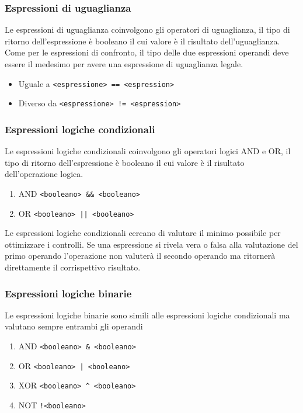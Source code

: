 \subsubsection{Espressioni di uguaglianza}
Le espressioni di uguaglianza coinvolgono gli operatori di uguaglianza, 
il tipo di ritorno dell'espressione è booleano il cui valore è il risultato dell'uguaglianza. 
\\
Come per le espressioni di confronto, il tipo delle due espressioni operandi deve essere il medesimo
per avere una espressione di uguaglianza legale.
\begin{itemize}
    \item Uguale a \lstinline|<espressione> == <espression>|
    \item Diverso da \lstinline|<espressione> != <espression>|
\end{itemize}

\subsubsection{Espressioni logiche condizionali}
Le espressioni logiche condizionali coinvolgono gli operatori logici AND e OR,
il tipo di ritorno dell'espressione è booleano il cui valore è il risultato dell'operazione logica.
\begin{enumerate}
    \item AND \lstinline|<booleano> && <booleano>|
    \item OR \lstinline=<booleano> || <booleano>=
\end{enumerate}

Le espressioni logiche condizionali cercano di valutare il minimo possibile per ottimizzare i controlli.
Se una espressione si rivela vera o falsa alla valutazione del primo operando l'operazione non 
valuterà il secondo operando ma ritornerà direttamente il corrispettivo risultato.

\subsubsection{Espressioni logiche binarie}
Le espressioni logiche binarie sono simili alle espressioni logiche condizionali ma valutano sempre
entrambi gli operandi
\begin{enumerate}
    \item AND \lstinline|<booleano> & <booleano>|
    \item OR \lstinline=<booleano> | <booleano>=
    \item XOR \lstinline|<booleano> ^ <booleano>|
    \item NOT \lstinline|!<booleano>|
\end{enumerate}

